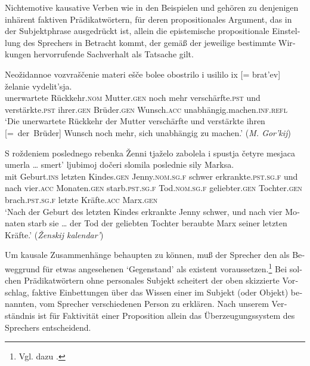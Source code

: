\documentclass[output=paper]{langscibook}
\begin{document}
\begin{otherlanguage}{german}
Nichtemotive kausative Verben wie in den Beispielen  und  gehören zu denjenigen inhärent faktiven Prädikatwörtern, für deren propositionales Argument, das in der Subjektphrase ausgedrückt ist, allein die epistemische propositionale Einstellung des Sprechers in Betracht kommt, der gemäß der jeweilige bestimmte Wirkungen hervorrufende Sachverhalt als Tatsache gilt. 

\ea \label{ex:zi83:56}
    \gll Neožidannoe vozvraščenie materi ešče bolee obostrilo i usililo ix [= brat’ev] želanie {vydelit’sja}. \\ 
    unerwartete Rückkehr.\textsc{nom}  Mutter.\textsc{gen} noch mehr verschärfte.\textsc{pst} und verstärkte.\textsc{pst} ihrer.\textsc{gen}  {} Brüder.\textsc{gen} Wunsch.\textsc{acc} unabhängig.machen.\textsc{inf}.\textsc{refl} \\
    \glt ‘Die unerwartete Rückkehr der Mutter verschärfte und verstärkte ihren \mbox{[= der Brüder]} Wunsch noch mehr, sich unabhängig zu machen.’ (\textit{M. Gor’kij})
    

\largerpage[2]
\ex \label{ex:zi83:57}
    \gll S roždeniem poslednego rebenka Ženni tjaželo zabolela i spustja četyre mesjaca umerla … smert’ ljubimoj dočeri slomila poslednie sily Marksa.  \\
    mit Geburt.\textsc{ins} letzten Kindes.\textsc{gen} Jenny.\textsc{nom}.\textsc{sg}.\textsc{f} schwer erkrankte.\textsc{pst}.\textsc{sg}.\textsc{f} und nach vier.\textsc{acc} Monaten.\textsc{gen} starb.\textsc{pst}.\textsc{sg}.\textsc{f} {} Tod.\textsc{nom}.\textsc{sg}.\textsc{f}  geliebter.\textsc{gen} Tochter.\textsc{gen} brach.\textsc{pst}.\textsc{sg}.\textsc{f}  letzte Kräfte.\textsc{acc} Marx.\textsc{gen} \\
    \glt ‘Nach der Geburt des letzten Kindes erkrankte Jenny schwer, und nach vier Monaten starb sie … der Tod der geliebten Tochter beraubte Marx seiner letzten Kräfte.’ (\textit{Ženskij kalendar’})
\z

\noindent Um kausale Zusammenhänge behaupten zu können, muß der Sprecher den als Beweggrund für etwas angesehenen ‘Gegenstand’ als existent voraussetzen.\footnote{Vgl. dazu \citet{vendler1967effects-results-and-consequences}.} Bei solchen Prädikatwörtern ohne personales Subjekt scheitert der oben skizzier\-te Vorschlag, faktive Einbettungen über das Wissen einer im Subjekt (oder Objekt) benannten, vom Sprecher verschiedenen Person zu erklären. Nach unserem Verständnis ist für Faktivität einer Proposition allein das Überzeugungssystem des Sprechers entscheidend.


\end{otherlanguage}
\end{document}
